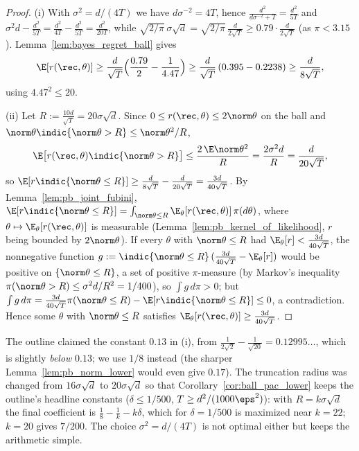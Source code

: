 \begin{proof}
\leanok
{}
(i) With $\sigma^2 = d/(4T)$ we have $d\sigma^{-2} = 4T$, hence
$\frac{d^2}{d\sigma^{-2}+T} = \frac{d^2}{5T}$ and $\sigma^2d-\frac{d^2}{5T} = \frac{d^2}{4T}-\frac{d^2}{5T} = \frac{d^2}{20T}$,
while $\sqrt{2/\pi}\,\sigma\sqrt d = \sqrt{2/\pi}\,\frac{d}{2\sqrt T} \ge 0.79\cdot\frac{d}{2\sqrt T}$
(as $\pi < 3.15$). Lemma~\ref{lem:bayes_regret_ball} gives
\[
  \E[r(\rec,\theta)]\ge\frac{d}{\sqrt T}\Big(\frac{0.79}{2}-\frac{1}{4.47}\Big)
  \ge\frac{d}{\sqrt T}\,(0.395-0.2238) \ge \frac{d}{8\sqrt T} ,
\]
using $4.47^2 \le 20$.

(ii) Let $R := \frac{10d}{\sqrt T} = 20\sigma\sqrt d$.
Since $0 \le r(\rec,\theta)\le2\norm\theta$ on the ball and
$\norm\theta\indic\{\norm\theta>R\}\le\norm\theta^2/R$,
\[
  \E\big[r(\rec,\theta)\indic\{\norm\theta>R\}\big]\le\frac{2\,\E\norm\theta^2}{R}
  = \frac{2\sigma^2d}{R} = \frac{d}{20\sqrt T} ,
\]
so $\E[r\indic\{\norm\theta\le R\}] \ge \frac{d}{8\sqrt T}-\frac{d}{20\sqrt T} = \frac{3d}{40\sqrt T}$.
By Lemma~\ref{lem:pb_joint_fubini}, $\E[r\indic\{\norm\theta\le R\}] = \int_{\norm\theta\le R}\E_\theta[r(\rec,\theta)]\,\pi(d\theta)$,
where $\theta\mapsto\E_\theta[r(\rec,\theta)]$ is measurable
(Lemma~\ref{lem:pb_kernel_of_likelihood}, $r$ being bounded by $2\norm\theta$).
If every $\theta$ with $\norm\theta\le R$ had $\E_\theta[r]<\frac{3d}{40\sqrt T}$, the
nonnegative function $g := \indic\{\norm\theta\le R\}\,(\frac{3d}{40\sqrt T} - \E_\theta[r])$
would be positive on $\{\norm\theta\le R\}$, a set of positive $\pi$-measure (by Markov's
inequality $\pi(\norm\theta>R)\le\sigma^2d/R^2 = 1/400$), so $\int g\,d\pi > 0$; but
$\int g\,d\pi = \frac{3d}{40\sqrt T}\pi(\norm\theta\le R) - \E[r\indic\{\norm\theta\le R\}] \le 0$,
a contradiction. Hence some $\theta$ with $\norm\theta\le R$ satisfies
$\E_\theta[r(\rec,\theta)]\ge\frac{3d}{40\sqrt T}$.
\end{proof}

\begin{remark}[Constants]\label{rem:pb_constants}
The outline claimed the constant $0.13$ in (i), from
$\frac{1}{2\sqrt2}-\frac{1}{\sqrt{20}} = 0.12995\ldots$, which is slightly \emph{below} $0.13$; we
use $1/8$ instead (the sharper Lemma~\ref{lem:pb_norm_lower} would even give $0.17$). The
truncation radius was changed from $16\sigma\sqrt d$ to $20\sigma\sqrt d$
so that Corollary~\ref{cor:ball_pac_lower} keeps the outline's headline constants
($\delta\le1/500$, $T\ge d^2/(1000\eps^2)$): with $R = k\sigma\sqrt d$ the final coefficient is
$\frac18-\frac1k-k\delta$, which for $\delta = 1/500$ is maximized near $k = 22$; $k = 20$ gives
$7/200$. The choice $\sigma^2 = d/(4T)$ is not optimal either but keeps the arithmetic simple.
\end{remark}

